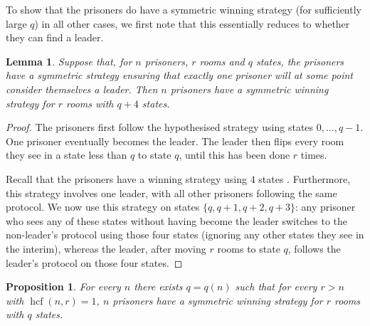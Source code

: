 \documentclass[a4paper,11pt]{extarticle}
\newtheorem{lemma}[theorem]{Lemma}
\newtheorem{proposition}[theorem]{Proposition}
\theoremstyle{definition}
\theoremstyle{remark}
\newcommand{\hcf}{\operatorname{hcf}}
\begin{document}
	To show that the prisoners do have a symmetric winning strategy (for sufficiently large $q$) in all other cases, we first note that this essentially reduces to whether they can find a leader. 
	\begin{lemma}\label{leader-wins}Suppose that, for $n$ prisoners, $r$ rooms and $q$ states, the prisoners have a symmetric strategy ensuring that exactly one prisoner will at some point consider themselves a leader. Then $n$ prisoners have a symmetric winning strategy for $r$ rooms with $q+4$ states.\end{lemma}
	\begin{proof}The prisoners first follow the hypothesised strategy using states $0,\ldots,q-1$. One prisoner eventually becomes the leader. The leader then flips every room they see in a state less than $q$ to state $q$, until this has been done $r$ times. 
		
		Recall that the prisoners have a winning strategy using $4$ states \cite[Theorem 5]{KK21}. Furthermore, this strategy involves one leader, with all other prisoners following the same protocol. We now use this strategy on states $\{q,q+1,q+2,q+3\}$: any prisoner who sees any of these states without having become the leader switches to the non-leader's protocol using those four states (ignoring any other states they see in the interim), whereas the leader, after moving $r$ rooms to state $q$, follows the leader's protocol on those four states.
	\end{proof}
	\begin{proposition}\label{n-smaller}
		For every $n$ there exists $q=q(n)$ such that for every $r>n$ with $\hcf(n,r)=1$, $n$ prisoners have a symmetric winning strategy for $r$ rooms with $q$ states.
	\end{proposition}
\end{document}
